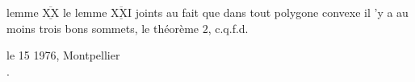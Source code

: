  lemme $\overline{\underline{\mathrm{XX}}}$ le lemme $\overline{\underline{\mathrm{XXI}}}$ joints au fait que dans tout polygone convexe il 'y a au moins trois bons sommets,  le théorème $2$, c.q.f.d.

\begin{flushright}
le 15  1976, Montpellier\\
.
\end{flushright}
